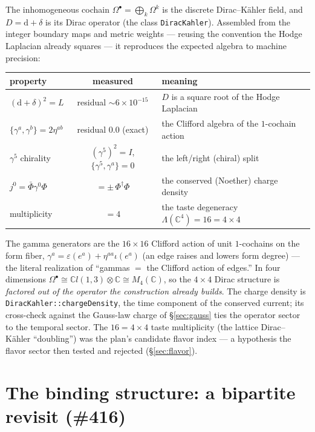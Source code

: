 \documentclass[11pt]{article}
\theoremstyle{definition}
\newcommand{\C}{\mathbb{C}}
\newcommand{\dd}{\mathrm{d}}
\newcommand{\code}[1]{\texttt{#1}}
\begin{document}
The inhomogeneous cochain $\Omega^\bullet=\bigoplus_k\Omega^k$ is the discrete
Dirac--K\"ahler field, and $D=\dd+\delta$ is its Dirac operator (the class
\code{DiracKahler}). Assembled from the integer boundary maps and metric weights ---
reusing the convention the Hodge Laplacian already squares --- it reproduces the expected
algebra to machine precision:

\begin{center}
\small
\begin{tabular}{@{}lcl@{}}
\toprule
property & measured & meaning\\
\midrule
$(\dd+\delta)^2 = L$ & residual $\sim 6\times10^{-15}$ & $D$ is a square root of the Hodge Laplacian\\
$\{\gamma^a,\gamma^b\}=2\eta^{ab}$ & residual $0.0$ (exact) & the Clifford algebra of the $1$-cochain action\\
$\gamma^5$ chirality & $(\gamma^5)^2=I$, $\{\gamma^5,\gamma^a\}=0$ & the left/right (chiral) split\\
$j^0=\bar\Phi\gamma^0\Phi$ & $=\pm\,\Phi^\dagger\Phi$ & the conserved (Noether) charge density\\
multiplicity & $=4$ & the taste degeneracy $\Lambda(\C^4)=16=4\times4$\\
\bottomrule
\end{tabular}
\end{center}

\noindent The gamma generators are the $16\times16$ Clifford action of unit $1$-cochains
on the form fiber, $\gamma^a=\varepsilon(e^a)+\eta^{aa}\iota(e^a)$ (an edge raises and
lowers form degree) --- the literal realization of ``gammas $=$ the Clifford action of
edges.'' In four dimensions $\Omega^\bullet\cong\C l(1,3)\otimes\C\cong M_4(\C)$, so the
$4\times4$ Dirac structure is \emph{factored out of the operator the construction already
builds}. The charge density is \code{DiracKahler::chargeDensity}, the time component of
the conserved current; its cross-check against the Gauss-law charge of \S\ref{sec:gauss}
ties the operator sector to the temporal sector. The $16=4\times4$ taste multiplicity (the
lattice Dirac--K\"ahler ``doubling'') was the plan's candidate flavor index --- a
hypothesis the flavor sector then tested and rejected (\S\ref{sec:flavor}).

\section{The binding structure: a bipartite revisit (\#416)}
\label{sec:bipartite}
\end{document}
